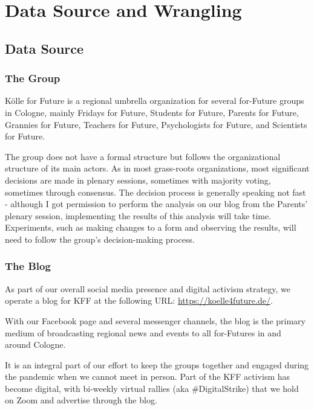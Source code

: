 %
%

\pagebreak
\section{Data Source and Wrangling}

\onehalfspacing

\subsection{Data Source}

\subsubsection{The Group}

Kölle for Future is a regional umbrella organization for several for-Future groups in Cologne, mainly Fridays for Future, Students for Future, Parents for Future, Grannies for Future, Teachers for Future, Psychologists for Future, and Scientists for Future.

The group does not have a formal structure but follows the organizational structure of its main actors. As in most grass-roots organizations, most significant decisions are made in plenary sessions, sometimes with majority voting, sometimes through consensus. The decision process is generally speaking not fast - although I got permission to perform the analysis on our blog from the Parents' plenary session, implementing the results of this analysis will take time. Experiments, such as making changes to a form and observing the results, will need to follow the group's decision-making process.

\subsubsection{The Blog}

As part of our overall social media presence and digital activism strategy, we operate a blog for KFF at the following URL: \url{https://koelle4future.de/}.

With our Facebook page and several messenger channels, the blog is the primary medium of broadcasting regional news and events to all for-Futures in and around Cologne.

It is an integral part of our effort to keep the groups together and engaged during the pandemic when we cannot meet in person. Part of the KFF activism has become digital, with bi-weekly virtual rallies (aka \#DigitalStrike) that we hold on Zoom and advertise through the blog. 

